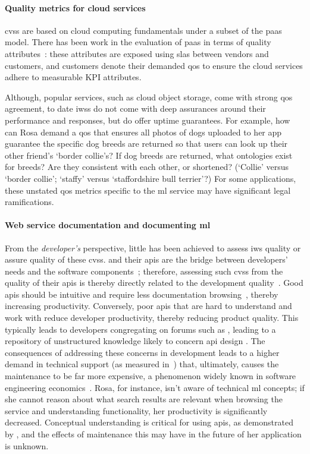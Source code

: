 \paragraph{Quality metrics for cloud services}
 
\glspl{cvs} are based on cloud computing fundamentals under a subset of the \gls{paas} model.  There has been work in the evaluation of \gls{paas} in terms of quality attributes~\citep{Garg:2011gw}: these attributes are exposed using \glspl{sla} between vendors and customers, and customers denote their demanded \gls{qos} to ensure the cloud services adhere to measurable KPI attributes. 

Although, popular services, such as cloud object storage, come with strong \gls{qos} agreement, to date \glspl{iws} do not come with deep assurances around their performance and responses, but do offer uptime guarantees. For example, how can Rosa demand a \gls{qos} that ensures all photos of dogs uploaded to her app guarantee the specific dog breeds are returned so that users can look up their other friend's `border collie's? If dog breeds are returned, what ontologies exist for breeds? Are they consistent with each other, or shortened? (`Collie' versus `border collie'; `staffy' versus `staffordshire bull terrier'?) For some applications, these unstated \gls{qos} metrics specific to the \gls{ml} service may have significant legal ramifications.

\paragraph{Web service documentation and documenting \gls{ml}}

From the \textit{developer's} perspective, little has been achieved to assess \gls{iws} quality or assure quality of these \glspl{cvs}.  and their \glspl{api} are the bridge between developers' needs and the software components~\citep{Arnold:2005vc}; therefore, assessing such \glspl{cvs} from the quality of their \glspl{api} is thereby directly related to the development quality~\citep{Ko:2004td}. Good \glspl{api} should be intuitive and require less documentation browsing~\citep{Piccioni:2013em}, thereby increasing productivity. Conversely, poor \glspl{api} that are hard to understand and work with reduce developer productivity, thereby reducing product quality. This typically leads to developers congregating on forums such as , leading to a repository of unstructured knowledge likely to concern \gls{api} design \citep{7180082}. The consequences of addressing these concerns in development leads to a higher demand in technical support (as measured in~\citep{Henning:2009hz}) that, ultimately, causes the maintenance to be far more expensive, a phenomenon widely known in software engineering economics~\citep{Boehm:1981ua}. Rosa, for instance, isn't aware of technical \gls{ml} concepts; if she cannot reason about what search results are relevant when browsing the service and understanding functionality, her productivity is significantly decreased. Conceptual understanding is critical for using \glspl{api}, as demonstrated by \citeauthor{Ko:2011fb}, and the effects of maintenance this may have in the future of her application is unknown.

